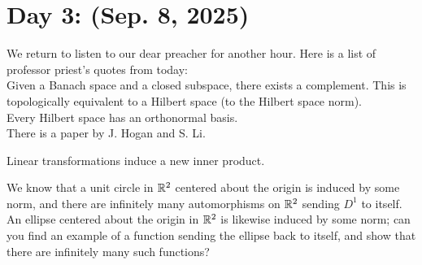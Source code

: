 \section{Day 3: (Sep. 8, 2025)}
We return to listen to our dear preacher for another hour. Here is a list of professor priest's quotes from today:
\\[8pt]
Given a Banach space and a closed subspace, there exists a complement. This is topologically equivalent to a Hilbert space (to the Hilbert space norm). 
\\[8pt]
Every Hilbert space has an orthonormal basis. 
\\[8pt]
There is a paper by J. Hogan and S. Li.
\begin{exercise}
    Linear transformations induce a new inner product.
\end{exercise}
\begin{exercise}
    We know that a unit circle in $\mathbb R^2$ centered about the origin is induced by some norm, and there are infinitely many automorphisms on $\mathbb R^2$ sending $D^1$ to itself. An ellipse centered about the origin in $\mathbb R^2$ is likewise induced by some norm; can you find an example of a function sending the ellipse back to itself, and show that there are infinitely many such functions?
\end{exercise}